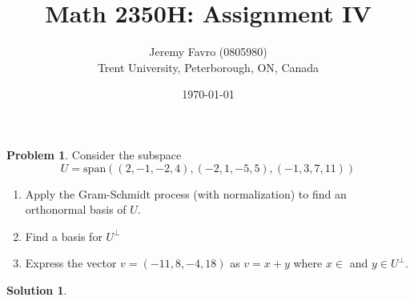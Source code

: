 \documentclass[10pt]{article}
\title{Math 2350H: Assignment IV}
\author{Jeremy Favro (0805980) \\ Trent University, Peterborough, ON, Canada}
\date{\today}
\theoremstyle{definition}
\newtheorem{problem}{Problem}
\newtheorem{soln}{Solution}
\begin{document}
\maketitle

\begin{problem}
Consider the subspace
$$U=\mathrm{span}\left(
  \left(2,-1,-2,4\right),
  \left(-2,1,-5,5\right),
  \left(-1,3,7,11\right)
  \right)$$
\begin{enumerate}[label=(\alph*)]
  \item Apply the Gram-Schmidt process (with normalization) to find an orthonormal basis of $U$.
  \item Find a basis for $U^\perp$
  \item Express the vector $v = (-11, 8, -4, 18)$ as $v = x + y$ where
        $x\in $ and $y \in U^\perp$.
\end{enumerate}
\end{problem}
\begin{soln}
\end{soln}
\end{document}
